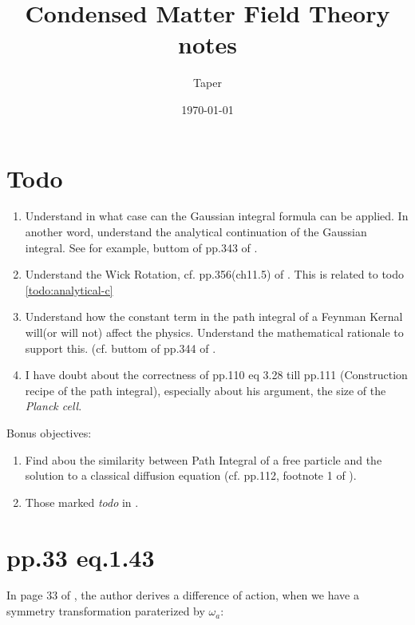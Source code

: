 \documentclass{article}
\title{Condensed Matter Field Theory notes}
\date{\today}
\author{Taper}
\begin{document}
\maketitle
{}
\tableofcontents

\section{Todo}

\begin{enumerate}
    \item Understand in what case can the Gaussian integral formula can be
        applied. In another word, understand the analytical continuation of the
        Gaussian integral. See for example, buttom of pp.343 of
        \cite{Greiner1996}.
        \label{todo:analytical-c}
    \item Understand the Wick Rotation, cf. pp.356(ch11.5) of
        \cite{Greiner1996}. This is related to todo \ref{todo:analytical-c}
    \item Understand how the constant term in the path integral of a Feynman
        Kernal will(or will not) affect the physics. Understand the mathematical
        rationale to support this. (cf. buttom of pp.344 of \cite{Greiner1996}.
    \item I have doubt about the correctness of pp.110 eq 3.28 till pp.111
        (Construction recipe of the path integral), especially about his
        argument, the size of the \textit{Planck cell}.
\end{enumerate}

Bonus objectives:
\begin{enumerate}
    \item Find abou the similarity between Path Integral of a free particle and
        the solution to a classical diffusion equation (cf. pp.112, footnote 1
        of \cite{Altland2010}).
    \item Those marked \textit{todo} in \cite{Altland2010}.
\end{enumerate}
\section{pp.33 eq.1.43}
\label{sec:Table}

In page 33 of \cite{Altland2010}, the author derives a difference of action, when we
have a symmetry transformation paraterized by $\omega_a$:
\end{document}
